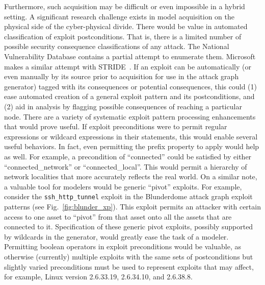 Furthermore, such acquisition may be difficult or even impossible in a
hybrid setting. A significant research challenge exists in model acquisition on
the physical side of the cyber-physical divide.
There would be value in automated classification of exploit postconditions.
That is, there is a limited number of possible security consequence
classifications of any attack. The National Vulnerability Database contains a
partial attempt to enumerate them. Microsoft makes a similar attempt with
STRIDE~\cite{shostack2008experiences}. If an exploit can be automatically (or even manually by its source
prior to acquisition for use in the attack graph generator) tagged with its
consequences or potential consequences, this could (1) ease automated creation of
a general exploit pattern and its postconditions, and (2) aid in analysis by
flagging possible consequences of reaching a particular node. 
There are a variety of systematic exploit pattern processing enhancements that
would prove useful.
If exploit preconditions were to permit regular expressions or wildcard
expressions in their statements, this would enable several useful behaviors.
In fact, even permitting the prefix property to apply would help as well. For
example, a precondition of ``connected'' could be satisfied by either
``connected\_network'' or ``connected\_local''. This would permit a hierarchy
of network localities that more accurately reflects the real world.
On a similar note, a valuable tool for modelers would be generic ``pivot''
exploits. For example, consider the \texttt{ssh\_http\_tunnel} exploit in the
Blunderdome attack graph exploit patterns (see Fig.~\ref{fig:blunder_xp}).
This exploit permits an attacker with certain access to one asset to ``pivot''
from that asset onto all the assets that are connected to it. Specification of
these generic pivot exploits, possibly supported by wildcards in the generator,
would greatly ease the task of a modeler.
Permitting boolean operators in exploit preconditions would be valuable, as
otherwise (currently) multiple exploits with the same sets of postconditions but
slightly varied preconditions must be used to represent exploits that may
affect, for example, Linux version 2.6.33.19, 2.6.34.10, and 2.6.38.8.
